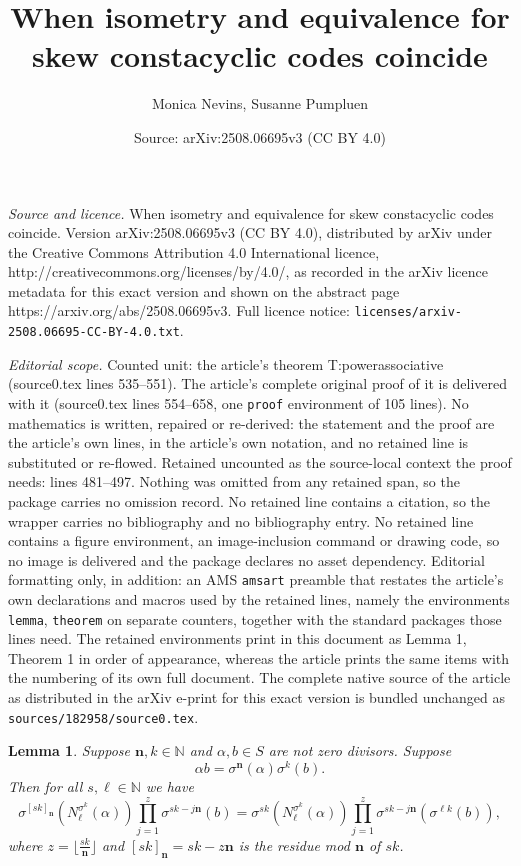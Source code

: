 \documentclass[10pt,a4paper]{amsart}
\title{When isometry and equivalence for skew constacyclic codes coincide}
\author{Monica Nevins, Susanne Pumpluen}
\date{Source: arXiv:2508.06695v3 (CC BY 4.0)}
\newtheorem{lemma}{Lemma}
\newcommand{\de}{\mathbf{n}}  %
\newcommand{\ring}{S}
\begin{document}
\maketitle

\noindent\emph{Source and licence.} When isometry and equivalence for skew constacyclic codes coincide. Version arXiv:2508.06695v3 (CC BY 4.0), distributed by arXiv under the Creative Commons Attribution 4.0 International licence, http://creativecommons.org/licenses/by/4.0/, as recorded in the arXiv licence metadata for this exact version and shown on the abstract page https://arxiv.org/abs/2508.06695v3. Full licence notice: \texttt{licenses/arxiv-2508.06695-CC-BY-4.0.txt}.\par\smallskip

\noindent\textit{Editorial scope.} Counted unit: the article's theorem T:powerassociative (source0.tex lines 535--551). The article's complete original proof of it is delivered with it (source0.tex lines 554--658, one \texttt{proof} environment of 105 lines). No mathematics is written, repaired or re-derived: the statement and the proof are the article's own lines, in the article's own notation, and no retained line is substituted or re-flowed.  Retained uncounted as the source-local context the proof needs: lines 481--497.  Nothing was omitted from any retained span, so the package carries no omission record.  No retained line contains a citation, so the wrapper carries no bibliography and no bibliography entry.  No retained line contains a figure environment, an image-inclusion command or drawing code, so no image is delivered and the package declares no asset dependency.  Editorial formatting only, in addition: an AMS \texttt{amsart} preamble that restates the article's own declarations and macros used by the retained lines, namely the environments \texttt{lemma}, \texttt{theorem} on separate counters, together with the standard packages those lines need.  The retained environments print in this document as Lemma 1, Theorem 1 in order of appearance, whereas the article prints the same items with the numbering of its own full document.  The complete native source of the article as distributed in the arXiv e-print for this exact version is bundled unchanged as \texttt{sources/182958/source0.tex}.
\begin{lemma}\label{L:keystep}
    Suppose $\de,k\in \mathbb{N}$ and $\alpha,b\in \ring$ are not zero divisors.  Suppose
\begin{equation}\label{E:conditiononassociativity}
    \alpha b = \sigma^{\de}(\alpha) \sigma^k(b).
    \end{equation}
    Then for all $s,\ell\in \mathbb{N}$ we have
    \begin{equation}\label{E:keyequality}
\sigma^{[sk]_{\de}}
(N_{\ell}^{\sigma^k}(\alpha))
\prod_{j=1}^z\sigma^{sk-j{\de}}(b) =
\sigma^{sk}
(N_{\ell}^{\sigma^k}(\alpha))
\prod_{j=1}^z\sigma^{sk-j{\de}}
(\sigma^{\ell k}(b)),
    \end{equation}
    where $z= \lfloor \frac{sk}{{\de}}\rfloor$ and $[sk]_{\de}=sk-z{\de}$ is the residue mod ${\de}$ of $sk$.
\end{lemma}
\end{document}
